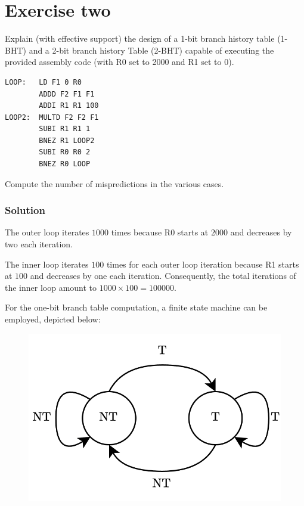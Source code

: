 \section{Exercise two}

Explain (with effective support) the design of a 1-bit branch history table (1-BHT) and a 2-bit branch history Table (2-BHT) capable of executing the provided assembly code (with R0 set to 2000 and R1 set to 0).
\begin{verbatim}
LOOP:   LD F1 0 R0
        ADDD F2 F1 F1
        ADDI R1 R1 100
LOOP2:  MULTD F2 F2 F1
        SUBI R1 R1 1
        BNEZ R1 LOOP2
        SUBI R0 R0 2
        BNEZ R0 LOOP
\end{verbatim}
Compute the number of mispredictions in the various cases. 

\subsubsection*{Solution}
The outer loop iterates $1000$ times because R0 starts at $2000$ and decreases by two each iteration.

The inner loop iterates $100$ times for each outer loop iteration because R1 starts at $100$ and decreases by one each iteration. 
Consequently, the total iterations of the inner loop amount to $1000 \times 100 = 100000$.

For the one-bit branch table computation, a finite state machine can be employed, depicted below:
\begin{figure}[H]
    \centering
    \includegraphics[width=0.4\linewidth]{images/1bht.png}
\end{figure}

